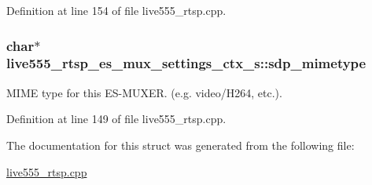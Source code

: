 Definition at line 154 of file live555\+\_\+rtsp.\+cpp.

\subsubsection[{\texorpdfstring{sdp\+\_\+mimetype}{sdp_mimetype}}]{\setlength{\rightskip}{0pt plus 5cm}char$\ast$ live555\+\_\+rtsp\+\_\+es\+\_\+mux\+\_\+settings\+\_\+ctx\+\_\+s\+::sdp\+\_\+mimetype}\hypertarget{structlive555__rtsp__es__mux__settings__ctx__s_add4d54b5d2dcca3713bf3bcaebd83539}{}\label{structlive555__rtsp__es__mux__settings__ctx__s_add4d54b5d2dcca3713bf3bcaebd83539}
M\+I\+ME type for this E\+S-\/\+M\+U\+X\+ER. (e.\+g. video/\+H264, etc.). 

Definition at line 149 of file live555\+\_\+rtsp.\+cpp.



The documentation for this struct was generated from the following file\+:\begin{DoxyCompactItemize}
\item 
\hyperlink{live555__rtsp_8cpp}{live555\+\_\+rtsp.\+cpp}\end{DoxyCompactItemize}
